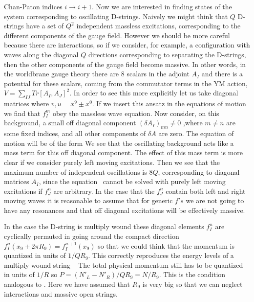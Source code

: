  Chan-Paton indices $i \rightarrow i+1 $. 
Now we are interested in finding states of the system 
corresponding to oscillating D-strings.
Naively we might think that $Q$ D-strings have a set of
$Q^2$ independent massless excitations, corresponding to the
different components of the gauge field. However we should be 
more careful because there are interactions, so if we 
consider, for example, a configuration with waves along
the diagonal  $Q$ directions
corresponding to separating the D-strings, then the other components
of the gauge field become massive. 
In other words, in the worldbrane  gauge theory there
are 8 scalars in the adjoint $A_I$ and there is a 
potential for these  scalars, coming from the commutator
terms in the YM action, $ V= \sum_{IJ} Tr [A_I,A_J]^2 $.
In order to see this more explicitly let us take diagonal 
matrices
\eqn{}
where $v,u = x^9 \pm x^0$. If we insert this ansatz in the
equations of motion we find that $f_I^m$ obey the massless
wave equation. Now  consider, on this background, a
small off diagonal component $
( \delta A_I)_{mn} \not = 0   $ ,where $m \not = n $ are
some fixed indices, and all other components of $\delta A $ are 
zero. The equation of motion will be of the form
\eqn{}
We see that the oscillating 
background acts like a mass term for this
off diagonal component. The effect of this mass term is more 
clear if we consider purely left moving excitations. Then 
we see that the maximum number of independent oscillations  is
 $8 Q$, corresponding  to diagonal matrices $A_I$, since
the equation \offdia\ cannot be solved with purely left 
moving 
 excitations if $f_J^n$ are arbitrary. 
In the case that the $f_J^n$ contain both left and right 
moving waves it is reasonable to assume that for generic
$f's$ we are not going to have any resonances and that 
off diagonal excitations will be effectively massive. 

In the case the D-string is multiply wound 
these  diagonal elements $f^n_I$  are cyclically permuted in going
around the compact direction $f^n_I(x_9 + 2 \pi R_9) = f^{n+1}_I(x_9 )$
 so that we could think
that the momentum is quantized in units of 
$1/QR_9$. This correctly  reproduces the 
energy  levels of a multiply wound string \dasmathur\ 
\eqn{}
The total physical momentum still has to be quantized in units
of $1/R$ so   
$P = (N'_L-N'_R )/QR_9 = N/R_9$. This is the condition 
analogous to \matching . Here we have assumed that 
$R_9$ is very big so that we can neglect interactions and
massive open strings. 

